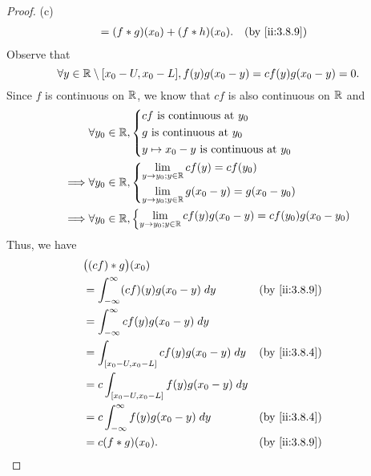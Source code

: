\begin{proof}{(c)}
\begin{align*}
     & = (f * g)(x_0) + (f * h)(x_0).                                                                           &  & \by{ii:3.8.9}
  \end{align*}
  Observe that
  \[
    \forall y \in \mathbb{R} \setminus [x_0 - U, x_0 - L], f(y) g(x_0 - y) = c f(y) g(x_0 - y) = 0.
  \]
  Since \(f\) is continuous on \(\mathbb{R}\), we know that \(cf\) is also continuous on \(\mathbb{R}\) and
  \begin{align*}
             & \forall y_0 \in \mathbb{R}, \begin{dcases}
                                     cf \text{ is continuous at } y_0 \\
                                     g \text{ is continuous at } y_0  \\
                                     y \mapsto x_0 - y \text{ is continuous at } y_0
                                   \end{dcases}                     \\
    \implies & \forall y_0 \in \mathbb{R}, \begin{dcases}
                                     \lim_{y \to y_0 ; y \in \mathbb{R}} cf(y) = cf(y_0) \\
                                     \lim_{y \to y_0 ; y \in \mathbb{R}} g(x_0 - y) = g(x_0 - y_0)
                                   \end{dcases}               \\
    \implies & \forall y_0 \in \mathbb{R}, \begin{dcases}
                                     \lim_{y \to y_0 ; y \in \mathbb{R}} cf(y) g(x_0 - y) = cf(y_0) g(x_0 - y_0)
                                   \end{dcases}
  \end{align*}
  Thus, we have
  \begin{align*}
     & \big((cf) * g\big)(x_0)                                                \\
     & = \int_{-\infty}^\infty (cf)(y) g(x_0 - y) \; dy    &  & \by{ii:3.8.9} \\
     & = \int_{-\infty}^\infty c f(y) g(x_0 - y) \; dy                        \\
     & = \int_{[x_0 - U, x_0 - L]} c f(y) g(x_0 - y) \; dy &  & \by{ii:3.8.4} \\
     & = c \int_{[x_0 - U, x_0 - L]} f(y) g(x_0 - y) \; dy                    \\
     & = c \int_{-\infty}^\infty f(y) g(x_0 - y) \; dy     &  & \by{ii:3.8.4} \\
     & = c (f * g)(x_0).                                   &  & \by{ii:3.8.9}

\end{align*}
\end{proof}
